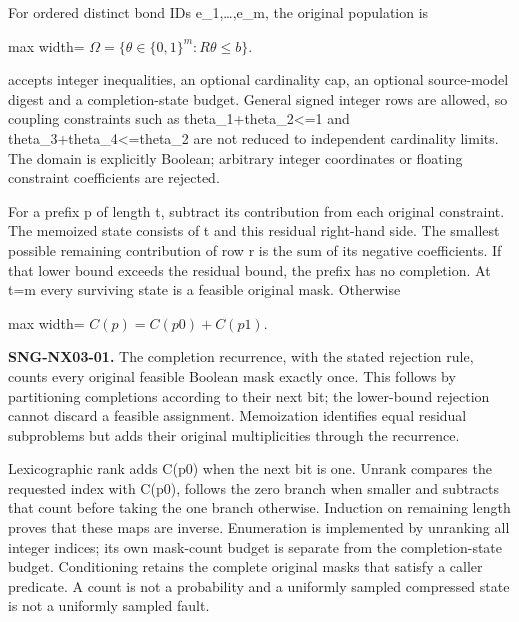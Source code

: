 \documentclass[
  11pt,
  a4paper,
]{report}
\let\singularitytexttt\texttt
\renewcommand{\texttt}[1]{\singularitytexttt{\seqsplit{#1}}}
\begin{document}
For ordered distinct bond IDs e\_1,\ldots,e\_m, the original population
is

\begin{center}
\begin{adjustbox}{max width=\linewidth}
$\displaystyle
\Omega=\{\theta\in\{0,1\}^m:R\theta\le b\}.
$
\end{adjustbox}
\end{center}

\texttt{FaultPopulation} accepts integer inequalities, an optional
cardinality cap, an optional source-model digest and a completion-state
budget. General signed integer rows are allowed, so coupling constraints
such as theta\_1+theta\_2\textless=1 and
theta\_3+theta\_4\textless=theta\_2 are not reduced to independent
cardinality limits. The domain is explicitly Boolean; arbitrary integer
coordinates or floating constraint coefficients are rejected.

For a prefix p of length t, subtract its contribution from each original
constraint. The memoized state consists of t and this residual
right-hand side. The smallest possible remaining contribution of row r
is the sum of its negative coefficients. If that lower bound exceeds the
residual bound, the prefix has no completion. At t=m every surviving
state is a feasible original mask. Otherwise

\begin{center}
\begin{adjustbox}{max width=\linewidth}
$\displaystyle
C(p)=C(p0)+C(p1).
$
\end{adjustbox}
\end{center}

\textbf{SNG-NX03-01.} The completion recurrence, with the stated
rejection rule, counts every original feasible Boolean mask exactly
once. This follows by partitioning completions according to their next
bit; the lower-bound rejection cannot discard a feasible assignment.
Memoization identifies equal residual subproblems but adds their
original multiplicities through the recurrence.

Lexicographic rank adds C(p0) when the next bit is one. Unrank compares
the requested index with C(p0), follows the zero branch when smaller and
subtracts that count before taking the one branch otherwise. Induction
on remaining length proves that these maps are inverse. Enumeration is
implemented by unranking all integer indices; its own mask-count budget
is separate from the completion-state budget. Conditioning retains the
complete original masks that satisfy a caller predicate. A count is not
a probability and a uniformly sampled compressed state is not a
uniformly sampled fault.
\end{document}
